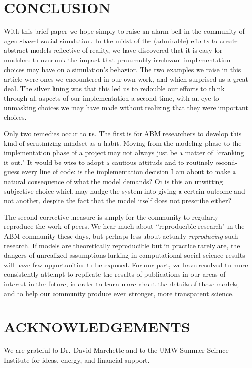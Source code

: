
\section{CONCLUSION}

With this brief paper we hope simply to raise an alarm bell in the community
of agent-based social simulation. In the midst of the (admirable) efforts to
create abstract models reflective of reality, we have discovered that it is
easy for modelers to overlook the impact that presumably irrelevant
implementation choices may have on a simulation's behavior. The two examples
we raise in this article were ones we encountered in our own work, and which
surprised us a great deal. The silver lining was that this led us to redouble
our efforts to think through all aspects of our implementation a second time,
with an eye to unmasking choices we may have made without realizing that they
were important choices.

Only two remedies occur to us. The first is for ABM researchers to develop
this kind of scrutinizing mindset as a habit. Moving from the modeling phase
to the implementation phase of a project may not always just be a matter of
``cranking it out." It would be wise to adopt a cautious attitude and to
routinely second-guess every line of code: is the implementation decision I am
about to make a natural consequence of what the model demands? Or is this an
unwitting subjective choice which may nudge the system into giving a certain
outcome and not another, despite the fact that the model itself does not
prescribe either?

The second corrective measure is simply for the community to regularly
reproduce the work of peers. We hear much about ``reproducible research" in
the ABM community these days, but perhaps less about actually
\textit{reproducing} such research. If models are theoretically reproducible
but in practice rarely are, the dangers of unrealized assumptions lurking in
computational social science results will have few opportunities to be
exposed. For our part, we have resolved to more consistently attempt to
replicate the results of publications in our areas of interest in the future,
in order to learn more about the details of these models, and to help our
community produce even stronger, more transparent science.

\section*{ACKNOWLEDGEMENTS}

We are grateful to Dr.~David Marchette and to the UMW Summer Science Institute
for ideas, energy, and financial support.
